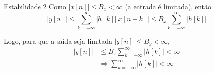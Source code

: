 \documentclass[
size=17pt,
paper=smartboard,
mode=present,
display=slidesnotes,
style=sailor,
nopagebreaks,
blackslide,
fleqn]{powerdot}
\begin{document}
\begin{slide}{Estabilidade 2}
    Como $|x[n]|\leq B_x < \infty$ (a entrada é limitada), então 
    \begin{equation*}|y[n]|\leq \sum_{k=-\infty}^{\infty} |h[k]||x[n-k]|\leq B_x\sum_{k=-\infty}^{\infty} |h[k]|\end{equation*}\pause
    
    Logo, para que a saída seja limitada $|y[n]|\leq B_y < \infty$,
    \begin{align*}|y[n]|&\leq B_x\sum_{k=-\infty}^{\infty} |h[k]| < \infty\\
                        &\Rightarrow \boxed{\sum_{k=-\infty}^{\infty} |h[k]| < \infty}
    \end{align*}
\end{slide}
\end{document}
